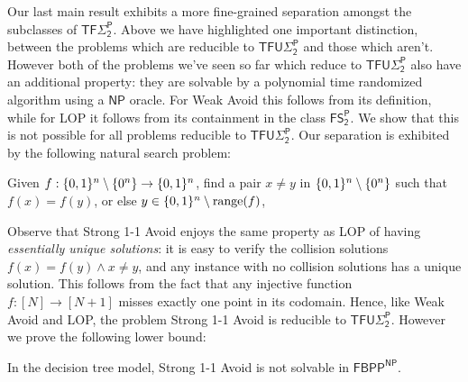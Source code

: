 Our last main result exhibits a more fine-grained separation amongst the subclasses of $\mathsf{TF\Sigma_2^P}$. Above we have highlighted one important distinction, between the problems which are reducible to $\mathsf{TFU\Sigma_2^P}$ and those which aren't. However both of the problems we've seen so far which reduce to $\mathsf{TFU\Sigma_2^P}$ also have an additional property: they are solvable by a polynomial time randomized algorithm using a $\mathsf{NP}$ oracle. For {\sc Weak Avoid} this follows from its definition, while for {\sc LOP} it follows from its containment in the class $\mathsf{FS_2^P}$. We show that this is not possible for all problems reducible to $\mathsf{TFU\Sigma_2^P}$. Our separation is exhibited by the following natural search problem: 
\begin{definition}
Given $f: \{0,1\}^n \setminus \{0^n\} \to \{0,1\}^n$, find a pair $x\neq y $ in $\{0,1\}^n \setminus \{0^n\}$ such that $f(x)=f(y)$, or else $y \in \{0,1\}^n \setminus \mathrm{range}(f)$, 
\end{definition}
Observe that {\sc Strong 1-1 Avoid} enjoys the same property as {\sc LOP} of having \emph{essentially unique solutions}: it is easy to verify the collision solutions $f(x)=f(y) \land x\neq y$, and any instance with no collision solutions has a unique solution. This follows from the fact that any injective function $f: [N] \to [N+1]$ misses exactly one point in its codomain. Hence, like {\sc Weak Avoid} and {\sc LOP}, the problem {\sc Strong 1-1 Avoid} is reducible to $\mathsf{TFU\Sigma_2^P}$. However we prove the following lower bound:

\begin{theorem}\label{thm:bpp-np-lb}

In the decision tree model, {\sc Strong 1-1 Avoid} is not solvable in $\mathsf{FBPP^{NP}}$.
\end{theorem}

